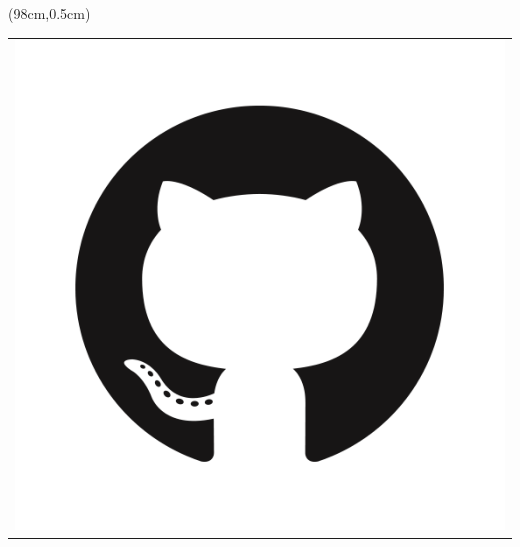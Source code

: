 \documentclass[a0,landscape]{a0poster}
\begin{document}
\begin{minipage}[b]{\linewidth}
	\begin{textblock*}{12cm}(98cm,0.5cm)
		\begin{tabular}{l}
			\href{https://github.com/OttaviaE/implicitMeasures}{\includegraphics[width=\linewidth]{github.png}}
		\end{tabular}
	
\end{textblock*}

\end{minipage}
%


\setlength{\columnseprule}{0.4pt}

\vspace{5mm}
\end{document}
